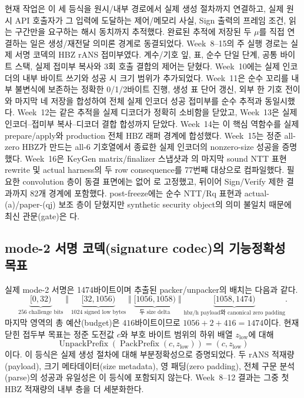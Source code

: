 현재 작업은 이 세 등식을 원시/내부 경로에서 실제 생성 절차까지 연결하고,
실제 원시 API 호출자가 그 입력에 도달하는 제어/메모리 사실, Sign 출력의
프레임 조건, 읽는 구간만을 요구하는 해시 동치까지 추적했다. 완료된 추적에
저장된 두 \(\mu\)를 직접 연결하는 일은 생성/재전달 의미론 경계로 동결되었다.
Week~8--15의 주 실행 경로는 실제 서명 코덱의 HBZ rANS 접미부였다. 계수/기호 잎, 표,
순수 단일 단계, 공통 바이트 스택, 실제 접미부 복사와 3회 호출 결합의 제어는
닫혔다. Week~10에는 실제 인코더의 내부 바이트 쓰기와 성공 시 크기 범위가
추가되었다. Week~11은 순수 꼬리를 내부 불변식에 보존하는 정확한
0/1/2바이트 진행, 생성 표 단어 갱신, 외부 한 기호 전이와 마지막 네 저장을
합성하여 전체 실제 인코더 성공 접미부를 순수 추적과 동일시했다. Week~12는
같은 추적을 실제 디코더가 정확히 소비함을 닫았고, Week~13은 실제
인코더--접미부 복사--디코더 결합 합성까지 닫았다. Week~14는 이 핵심
역함수를 실제 prepare/apply와 production 전체 HBZ 래퍼 경계에 합성했다.
Week~15는 정준 all-zero HBZ가 만드는 all-6 기호열에서 종료한 실제 인코더의
nonzero-size 성공을 증명했다. Week~16은 KeyGen matrix/finalizer 스냅샷과
의 마지막 sound NTT 표현 rewrite 및 actual harness의
두 row consequence를 77번째 대상으로 컴파일했다. 필요한 convolution 층이
동결 표면에는 없어 로 고정했고, 뒤이어 Sign/Verify
제한 결과까지 82개  경계에 포함했다. post-freeze에는
순수 NTT/Rq 표현과 actual-(a)/paper-(qj) 보조 층이 닫혔지만 synthetic
security object의 의미 불일치 때문에 최신 관문(gate)은
다.

\subsection{mode-2 서명 코덱(signature codec)의 기능정확성 목표}

실제 mode-2 서명은 1474바이트이며 추출된 packer/unpacker의 배치는 다음과
같다.
\[
\underbrace{[0,32)}_{256\text{ challenge bits}}
\;\Vert\;
\underbrace{[32,1056)}_{1024\text{ signed low bytes}}
\;\Vert\;
\underbrace{[1056,1058)}_{\text{두 size delta}}
\;\Vert\;
\underbrace{[1058,1474)}_{\text{hbz/h payload와 canonical zero padding}}.
\]
마지막 영역의 총 예산(budget)은 \(416\)바이트이므로
\(1056+2+416=1474\)이다. 현재 닫힌 접두부 목표는 정준 도전값
\(c\)와 부호 바이트 범위의 하위 배열 \(z_{\mathrm{low}}\)에 대해
\[
  \operatorname{UnpackPrefix}
    (\operatorname{PackPrefix}(c,z_{\mathrm{low}}))
  =(c,z_{\mathrm{low}})
\]
이다. 이 등식은 실제 생성 절차에 대해 부분정확성으로 증명되었다. 두 rANS
적재량(payload), 크기 메타데이터(size metadata), 영 패딩(zero padding), 전체
구문 분석(parse)의 성공과 유일성은 이 등식에 포함되지 않는다. Week~8--12
결과는 그중 첫 HBZ 적재량의 내부 층을 더
세분화한다.

